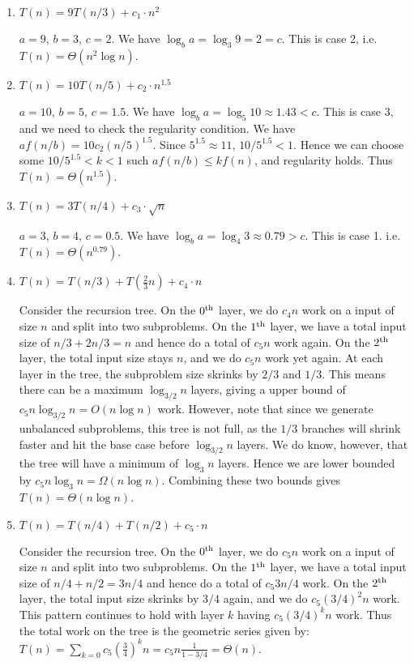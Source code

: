 \documentclass[10pt]{article}
\providecommand{\Kth}[1]{\ensuremath{{#1}^{\rm th}}}
\begin{document}
\begin{enumerate}
\item $T(n) = 9 T(n/3) + c_1 \cdot n^2$

\(a = 9\), \(b = 3\), \(c = 2\). We have \(\log_{b} a = \log_3 9 = 2 = c\). This is case 2, i.e. 
\(\boxed{T(n) = \Theta(n^2 \log n)}\).

\item $T(n) = 10 T(n/5) + c_2 \cdot n^{1.5}$

\(a = 10\), \(b = 5\), \(c = 1.5\). We have \(\log_{b} a = \log_5 10 \approx 1.43 < c\). This is case 3, and we need to check the regularity condition. We have \(a f(n / b) = 10 c_2 (n / 5)^{1.5}\). Since \(5^{1.5} \approx 11\), \(10 / 5^{1.5} < 1\). Hence we can choose some \(10 / 5^{1.5} < k < 1\) such \(a f(n / b) \leq k f(n)\), and regularity holds. Thus \(\boxed{T(n) = \Theta(n^{1.5})}\).

\item $T(n) = 3 T(n/4) + c_3 \cdot \sqrt{n}$

\(a = 3\), \(b = 4\), \(c = 0.5\). We have \(\log_{b} a = \log_4 3 \approx 0.79 > c\). This is case 1. i.e. \(\boxed{T(n) = \Theta(n^{0.79})}\).

\item $T(n) = T(n/3) + T(\frac{2}{3} n) + c_4 \cdot n$

Consider the recursion tree. On the \Kth{0} layer, we do \(c_4 n\) work on a input of size \(n\) and split into two subproblems. On the \Kth{1} layer, we have a total input size of \(n/3 + 2n/3 = n\) and hence do a total of \(c_5 n\) work again. On the \Kth{2} layer, the total input size stays \(n\), and we do \(c_5 n\) work yet again. At each layer in the tree, the subproblem size skrinks by \(2/3\) and \(1/3\). This means there can be a maximum \(\log_{3/2} n\) layers, giving a upper bound of \(c_5 n \log_{3/2} n = O(n \log n)\) work. However, note that since we generate unbalanced subproblems, this tree is not full, as the \(1/3\) branches will shrink faster and hit the base case before \(\log_{3/2} n\) layers. We do know, however, that the tree will have a minimum of \(\log_3 n\) layers. Hence we are lower bounded by \(c_5 n \log_3 n = \Omega(n \log n)\). Combining these two bounds gives \(T(n) = \boxed{\Theta(n \log n)}\).

\item $T(n) = T(n/4) + T(n/2) + c_5 \cdot n$

Consider the recursion tree. On the \Kth{0} layer, we do \(c_5 n\) work on a input of size \(n\) and split into two subproblems. On the \Kth{1} layer, we have a total input size of \(n/4 + n/2 = 3n/4\) and hence do a total of \(c_5 3n/4\) work. On the \Kth{2} layer, the total input size skrinks by \(3/4\) again, and we do \(c_5 (3/4)^2 n\) work. This pattern continues to hold with layer \(k\) having \(c_5 (3/4)^k n\) work. Thus the total work on the tree is the geometric series given by: \(T(n) = \sum_{k = 0} c_5 \left(\frac{3}{4}\right)^k n = c_5 n \frac{1}{1 - 3/4} = \boxed{\Theta(n)}\).
\end{enumerate}
\end{document}
